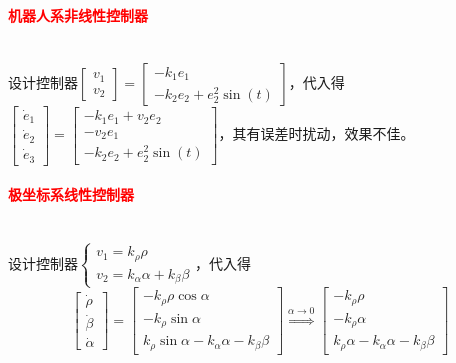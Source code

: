 \documentclass[
12pt, %
a4paper, 
oneside, %
]{scrartcl}
\begin{document}
\paragraph{\textcolor{red}{机器人系非线性控制器}}~\\

设计控制器$ \begin{bmatrix} v_1 \\ v_2 \end{bmatrix} = \begin{bmatrix} -k_1 e_1 \\ -k_2 e_2 + e_2^2 \sin(t) \end{bmatrix} $，代入得$ \begin{bmatrix} \dot{e}_1 \\ \dot{e}_2 \\ \dot{e}_3 \end{bmatrix} = \begin{bmatrix} -k_1 e_1 + v_2 e_2 \\ -v_2 e_1 \\ -k_2 e_2 + e_2^2 \sin(t) \end{bmatrix} $，其有误差时扰动，效果不佳。
\paragraph{\textcolor{red}{极坐标系线性控制器}}~\\

设计控制器$ \begin{cases} v_1 = k_\rho \rho \\ v_2 = k_\alpha \alpha + k_\beta \beta \end{cases} $，代入得
$$ 
\begin{bmatrix} \dot{\rho} \\ \dot{\beta} \\ \dot{\alpha} \end{bmatrix} 
= \begin{bmatrix} -k_\rho \rho \cos\alpha \\ -k_\rho \sin\alpha \\ k_\rho \sin\alpha - k_\alpha \alpha - k_\beta \beta \end{bmatrix} 
\overset{\alpha \to 0}{\Longrightarrow} \begin{bmatrix} -k_\rho \rho \\ -k_\rho \alpha \\ k_\rho \alpha - k_\alpha \alpha - k_\beta \beta \end{bmatrix} 
$$
\end{document}
